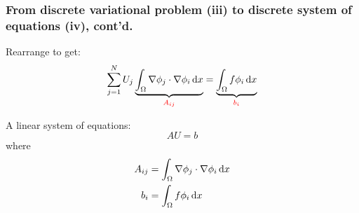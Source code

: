 \begin{frame}
  \frametitle{From discrete variational problem (iii) to discrete
    system of equations (iv), cont'd.}

  Rearrange to get:
  \begin{equation*}
    \sum_{j=1}^N U_j
    \underbrace{\int_{\Omega} \nabla \phi_j \cdot
      \nabla \phi_i \, \mathrm{d}x}_{\textcolor{red}{A_{ij}}}
    = \underbrace{\int_{\Omega} f\phi_i \, \mathrm{d}x}_{\textcolor{red}{b_i}}
  \end{equation*}

  A linear system of equations:
  \begin{equation*}
    A U = b
  \end{equation*}
  where
  \begin{align}
    A_{ij} &= \int_{\Omega} \nabla \phi_j \cdot \nabla \phi_i \, \mathrm{d}x \\
    b_i   &= \int_{\Omega} f\phi_i \, \mathrm{d}x
  \end{align}

\end{frame}
